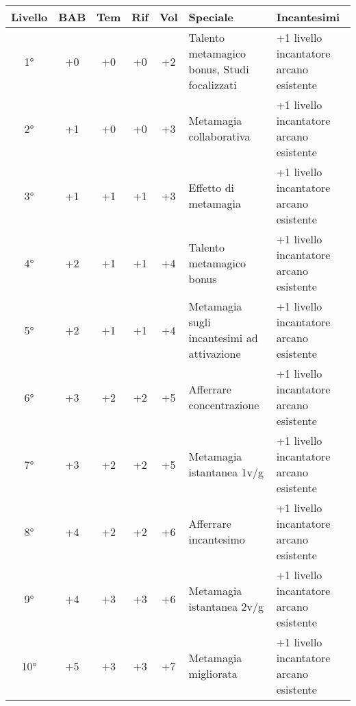 \documentclass[a4paper]{report}
\begin{document}
\hspace{-1.6cm}
\begin{tabular}{|c|c|c|c|c|l|l|}
	\hline
	\textbf{Livello} & \textbf{BAB} & \textbf{Tem} & \textbf{Rif} & \textbf{Vol} & \textbf{Speciale} & \textbf{Incantesimi} \\
	\hline
	1° & +0  & +0  & +0  & +2 & Talento metamagico bonus, Studi focalizzati & +1 livello incantatore arcano esistente \\
	\hline
	2° & +1  & +0  & +0  & +3 & Metamagia collaborativa                       & +1 livello incantatore arcano esistente \\
	\hline
	3° & +1  & +1  & +1  & +3 & Effetto di metamagia                             & +1 livello incantatore arcano esistente \\
	\hline
	4° & +2  & +1  & +1  & +4 & Talento metamagico bonus                        & +1 livello incantatore arcano esistente \\
	\hline
	5° & +2  & +1  & +1  & +4 & Metamagia sugli incantesimi ad attivazione     & +1 livello incantatore arcano esistente \\
	\hline
	6° & +3  & +2  & +2  & +5 & Afferrare concentrazione                          & +1 livello incantatore arcano esistente \\
	\hline
	7° & +3  & +2  & +2  & +5 & Metamagia istantanea 1v/g 						& +1 livello incantatore arcano esistente \\
	\hline
	8° & +4  & +2  & +2  & +6 & Afferrare incantesimo                                 & +1 livello incantatore arcano esistente \\
	\hline
	9° & +4  & +3  & +3  & +6 & Metamagia istantanea 2v/g                      & +1 livello incantatore arcano esistente \\
	\hline
	10° & +5 & +3  & +3  & +7 & Metamagia migliorata     & +1 livello incantatore arcano esistente \\
	\hline
\end{tabular}
\newpage
\end{document}
